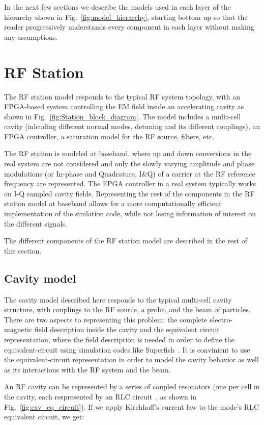 \documentclass[a4paper,12pt]{article}
\begin{document}
In the next few sections we describe the models used in each layer of the hierarchy shown in Fig.~\ref{fig:model_hierarchy}, starting bottom up so that the reader progressively understands every component in each layer without making any assumptions.

\section{RF Station}

The RF station model responds to the typical RF system topology, with an FPGA-based system controlling the EM field inside an accelerating cavity as shown in Fig.~\ref{fig:Station_block_diagram}.
The model includes a multi-cell cavity (inlcuding different normal modes, detuning and its different couplings), an FPGA controller, a saturation model for the RF source, filters, etc.

The RF station is modeled at baseband, where up and down conversions in the real system are not considered and only the slowly varying amplitude and phase modulations (or In-phase and Quadrature, I\&Q) of a carrier at the RF reference frequency are represented. The FPGA controller in a real system typically works on I-Q sampled cavity fields. Representing the rest of the components in the RF station model at baseband allows for a more computationally efficient implementation of the simlation code, while not losing information of interest on the different signals. 

The different components of the RF station model are described in the rest of this section.

\subsection{Cavity model}


The cavity model described here responds to the typical multi-cell cavity structure, with couplings to the RF source, a probe, and the beam of particles. There are two aspects to representing this problem: the complete electro-magnetic field description inside the cavity and the equivalent circuit representation, where the field description is needed in order to define the equivalent-circuit using simulation codes like Superfish~\cite{ref:superfish}. It is convinient to use the equivalent-circuit representation in order to model the cavity behavior as well as its interactions with the RF system and the beam.

An RF cavity can be represented by a series of coupled resonators (one per cell in the cavity, each respresented by an RLC circuit~\cite{ref:montgomery}, as shown in Fig.~\ref{fig:cav_eq_circuit}). If we apply Kirchhoff's current law to the mode's RLC equivalent circuit, we get:
\end{document}
